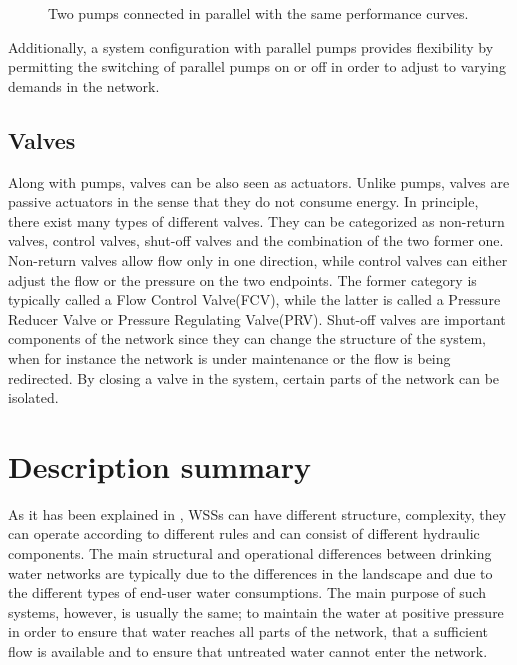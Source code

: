 \begin{figure}[H]
\centering
 
\caption{Two pumps connected in parallel with the same performance curves.}
\label{fig:parallelpumpcurve}
\end{figure}

\vspace{-3mm}

Additionally, a system configuration with parallel pumps provides flexibility by permitting the switching of parallel pumps on or off in order to adjust to varying demands in the network. 

\subsection{Valves}
\label{valves}

Along with pumps, valves can be also seen as actuators. Unlike pumps, valves are passive actuators in the sense that they do not consume energy. In principle, there exist many types of different valves. They can be categorized as non-return valves, control valves, shut-off valves and the combination of the two former one. Non-return valves allow flow only in one direction, while control valves can either adjust the flow or the pressure on the two endpoints. The former category is typically called a Flow Control Valve(FCV), while the latter is called a Pressure Reducer Valve or Pressure Regulating Valve(PRV). Shut-off valves are important components of the network since they can change the structure of the system, when for instance the network is under maintenance or the flow is being redirected. By closing a valve in the system, certain parts of the network can be isolated.

\section{Description summary}
\label{distribution_system_solutions}

As it has been explained in , WSSs can have different structure, complexity, they can operate according to different rules and can consist of different hydraulic components. The main structural and operational differences between drinking water networks are typically due to the differences in the landscape and due to the different types of end-user water consumptions. The main purpose of such systems, however, is usually the same; to maintain the water at positive pressure in order to ensure that water reaches all parts of the network, that a sufficient flow is available and to ensure that untreated water cannot enter the network. 


